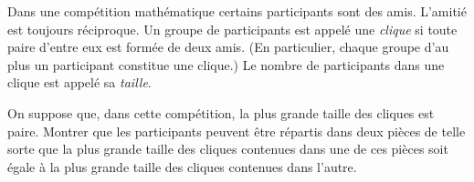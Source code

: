 Dans une compétition mathématique certains participants sont des amis. L'amitié est toujours réciproque. Un
groupe de participants est appelé une \emph{clique} si toute paire d'entre eux est formée de deux amis. (En
particulier, chaque groupe d'au plus un participant constitue une clique.) Le nombre de participants dans une
clique est appelé sa \emph{taille}.

On suppose que, dans cette compétition, la plus grande taille des cliques est paire. Montrer que les
participants peuvent être répartis dans deux pièces de telle sorte que la plus grande taille des cliques
contenues dans une de ces pièces soit égale à la plus grande taille des cliques contenues dans l'autre.
